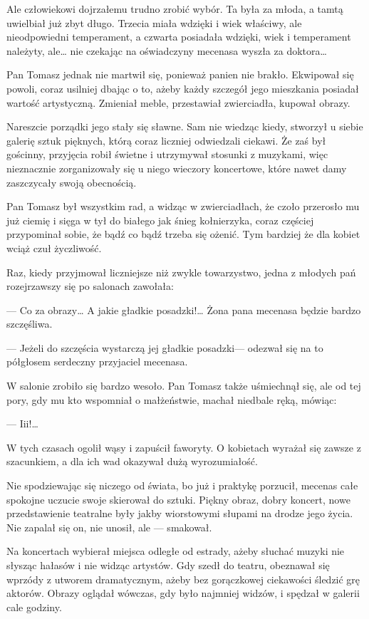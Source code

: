 Ale człowiekowi dojrzałemu trudno zrobić wybór. Ta była za młoda, a
tamtą uwielbiał już zbyt długo. Trzecia miała wdzięki i wiek właściwy,
ale nieodpowiedni temperament, a czwarta posiadała wdzięki, wiek i
temperament należyty, ale… nie czekając na oświadczyny mecenasa wyszła
za doktora…

Pan Tomasz jednak nie martwił się, ponieważ panien nie
brakło. Ekwipował się powoli, coraz usilniej dbając o to, ażeby każdy
szczegół jego mieszkania posiadał wartość artystyczną. Zmieniał meble,
przestawiał zwierciadła, kupował obrazy.

Nareszcie porządki jego stały się sławne. Sam nie wiedząc kiedy,
stworzył u siebie galerię sztuk pięknych, którą coraz liczniej
odwiedzali ciekawi. Że zaś był gościnny, przyjęcia robił świetne i
utrzymywał stosunki z muzykami, więc nieznacznie zorganizowały się u
niego wieczory koncertowe, które nawet damy zaszczycały swoją
obecnością.

Pan Tomasz był wszystkim rad, a widząc w zwierciadłach, że czoło
przerosło mu już ciemię i sięga w tył do białego jak śnieg
kołnierzyka, coraz częściej przypominał sobie, że bądź co bądź trzeba
się ożenić. Tym bardziej że dla kobiet wciąż czuł życzliwość.

Raz, kiedy przyjmował liczniejsze niż zwykle towarzystwo, jedna z
młodych pań rozejrzawszy się po salonach zawołała:

— Co za obrazy… A jakie gładkie posadzki!… Żona pana mecenasa będzie
bardzo szczęśliwa.

— Jeżeli do szczęścia wystarczą jej gładkie posadzki— odezwał się na
to półgłosem serdeczny przyjaciel mecenasa.

W salonie zrobiło się bardzo wesoło. Pan Tomasz także uśmiechnął się,
ale od tej pory, gdy mu kto wspomniał o małżeństwie, machał niedbale
ręką, mówiąc:

— Iii!…

W tych czasach ogolił wąsy i zapuścił faworyty. O kobietach wyrażał
się zawsze z szacunkiem, a dla ich wad okazywał dużą wyrozumiałość.

Nie spodziewając się niczego od świata, bo już i praktykę porzucił,
mecenas całe spokojne uczucie swoje skierował do sztuki. Piękny obraz,
dobry koncert, nowe przedstawienie teatralne były jakby wiorstowymi
słupami na drodze jego życia. Nie zapalał się on, nie unosił, ale —
smakował.

Na koncertach wybierał miejsca odległe od estrady, ażeby słuchać
muzyki nie słysząc hałasów i nie widząc artystów. Gdy szedł do teatru,
obeznawał się wprzódy z utworem dramatycznym, ażeby bez gorączkowej
ciekawości śledzić grę aktorów. Obrazy oglądał wówczas, gdy było
najmniej widzów, i spędzał w galerii cale godziny.

